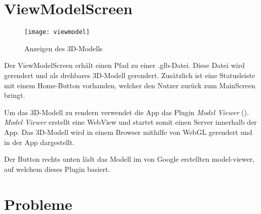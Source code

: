 \clearpage
\section{ViewModelScreen}
\begin{figure}[htpb]
    \centering
    \texttt{[image: viewmodel]}
    \caption{Anzeigen des 3D-Modells}
    \label{img:viewmodel}
\end{figure}

Der ViewModelScreen erhält einen Pfad zu einer .glb-Datei. Diese Datei wird gerendert und als drehbares 3D-Modell gerendert. Zusätzlich ist eine Statusleiste mit einem Home-Button 
vorhanden, welcher den Nutzer zurück zum MainScreen bringt. 

Um das 3D-Modell zu rendern verwendet die App das Plugin \textit{Model Viewer} (\cite{misc:modelviewer}). \textit{Model Viewer} erstellt eine WebView und startet somit einen Server 
innerhalb der App. Das 3D-Modell wird in einem Browser mithilfe von WebGL gerendert und in der App dargestellt.

Der Button rechts unten lädt das Modell im von Google erstellten model-viewer, auf welchem dieses Plugin basiert.

\pagebreak
\section{Probleme}

